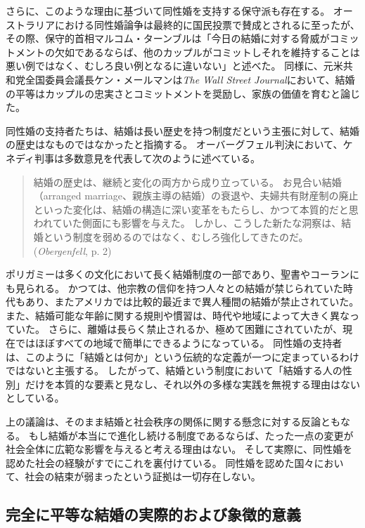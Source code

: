 \documentclass[paper=a4,book,openany]{jlreq}
\begin{document}
さらに、このような理由に基づいて同性婚を支持する保守派も存在する。
オーストラリアにおける同性婚論争は最終的に国民投票で賛成とされるに至ったが、その際、保守的首相マルコム・ターンブルは「今日の結婚に対する脅威がコミットメントの欠如であるならば、他のカップルがコミットしそれを維持することは悪い例ではなく、むしろ良い例となるに違いない」と述べた\citep{gartrell17:_malcol_turnb_makes_conser_case}。
同様に、元米共和党全国委員会議長ケン・メールマンは\emph{The Wall Street Journal}において、結婚の平等はカップルの忠実さとコミットメントを奨励し、家族の価値を育むと論じた\citep{mehlman12:_makin_same_sex_case}。

同性婚の支持者たちは、結婚は長い歴史を持つ制度だという主張に対して、結婚の歴史はなものではなかったと指摘する。
オーバーグフェル判決において、ケネディ判事は多数意見を代表して次のように述べている。

\begin{quote}
結婚の歴史は、継続と変化の両方から成り立っている。
お見合い結婚（arranged marriage、親族主導の結婚）の衰退や、夫婦共有財産制の廃止といった変化は、結婚の構造に深い変革をもたらし、かつて本質的だと思われていた側面にも影響を与えた。
しかし、こうした新たな洞察は、結婚という制度を弱めるのではなく、むしろ強化してきたのだ。
(\emph{Obergenfell}, p. 2)
\end{quote}

ポリガミーは多くの文化において長く結婚制度の一部であり、聖書やコーランにも見られる。
かつては、他宗教の信仰を持つ人々との結婚が禁じられていた時代もあり、またアメリカでは比較的最近まで異人種間の結婚が禁止されていた。
また、結婚可能な年齢に関する規則や慣習は、時代や地域によって大きく異なっていた。
さらに、離婚は長らく禁止されるか、極めて困難にされていたが、現在ではほぼすべての地域で簡単にできるようになっている。
同性婚の支持者は、このように「結婚とは何か」という伝統的な定義が一つに定まっているわけではないと主張する。
したがって、結婚という制度において「結婚する人の性別」だけを本質的な要素と見なし、それ以外の多様な実践を無視する理由はないとしている。

上の議論は、そのまま結婚と社会秩序の関係に関する懸念に対する反論ともなる。
もし結婚が本当にで進化し続ける制度であるならば、たった一点の変更が社会全体に広範な影響を与えると考える理由はない。
そして実際に、同性婚を認めた社会の経験がすでにこれを裏付けている。
同性婚を認めた国々において、社会の結束が弱まったという証拠は一切存在しない。

\subsection{完全に平等な結婚の実際的および象徴的意義}
\end{document}

